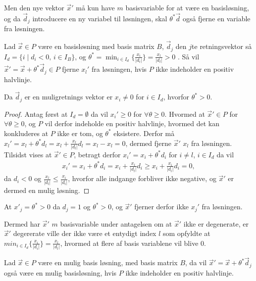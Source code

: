 Men den nye vektor $\vec{x}'$ må kun have $m$ basisvariable for at være en basisløsning, og da $\vec{d}_j$ introducere en ny variabel til løsningen, skal $\theta^*\vec{d}$ også fjerne en variable fra  løsningen.
\begin{lma}
Lad $\vec{x} \in P$ være en basisløsning med basis matrix $B$, $\vec{d}_j$ den $j$te retningsvektor så $I_d = \{i \mid d_i < 0, \, i  \in I_B\}$, og $\theta^* = \min_{i \in I_d}\{\frac{x_i}{|d_i|}\}=\frac{x_l}{|d_l|} > 0$ . 
Så vil $\vec{x}' = \vec{x}+ \theta^* \vec{d}_j \in P$ fjerne $x_l'$ fra løsningen, hvis $P$ ikke indeholder en positiv halvlinje.
\label{lma:skalar}
\end{lma}
\begin{bem}
Da $\vec{d}_j$ er en muligretnings vektor er $x_i\neq 0$ for $i \in I_d$, hvorfor $\theta^* > 0$.
\end{bem}
\begin{proof}
Antag først at $I_d = \emptyset$ da vil $x_i' \geq 0$ for $\forall \theta \geq 0$. 
Hvormed at $\vec{x}' \in P$ for $\forall \theta \geq 0$, og $P$ vil derfor indeholde en positiv halvlinje, hvormed det kan konkluderes at $P$ ikke er tom, og $\theta^*$ eksistere.
Derfor må $x_l' = x_l + \theta^* d_l = x_l + \frac{x_l}{|d_l|}d_l = x_l - x_l = 0$, dermed fjerne $\vec{x}'$ $x_l$ fra løsningen.
Tilsidst vises at $\vec{x}' \in P$, betragt derfor $x_i' = x_i + \theta^* d_i$ for $i \neq l$, $i \in I_d$ da vil
\begin{align*}
x_i' = x_i + \theta^* d_i = x_i + \frac{x_l}{|d_l|}d_i \geq x_i + \frac{x_i}{|d_i|}d_i = 0,
\end{align*}
da $d_i < 0$ og $\frac{x_l}{|d_l|} \leq \frac{x_i}{|d_i|}$, hvorfor alle indgange forbliver ikke negative, og $\vec{x}'$ er dermed en mulig løsning.
\end{proof}
\begin{bem}
At $x'_j = \theta^* >  0$ da $d_j = 1$ og $\theta^* > 0$, og $\vec{x}'$ fjerner derfor ikke $x_j'$ fra løsningen.
\end{bem}
Dermed har $\vec{x}'$ $m$ basisvariable under antagelsen om at $\vec{x}'$ ikke er degenerate, er $\vec{x}'$ degererate ville der ikke være et entydigt index $l$ som opfyldte at $min_{i \in I_d}\{\frac{x_i}{|d_i|}\}=\frac{x_l}{|d_l|}$, hvormed at flere af basis variablene  vil blive 0. 
\begin{stn}
Lad $\vec{x}\in P$ være en mulig basis løsning, med basis matrix $B$, da vil $\vec{x}' = \vec{x}+ \theta^*\vec{d}_j$ også være en mulig basisløsning, hvis $P$ ikke indeholder en positiv halvlinje.
\end{stn}
